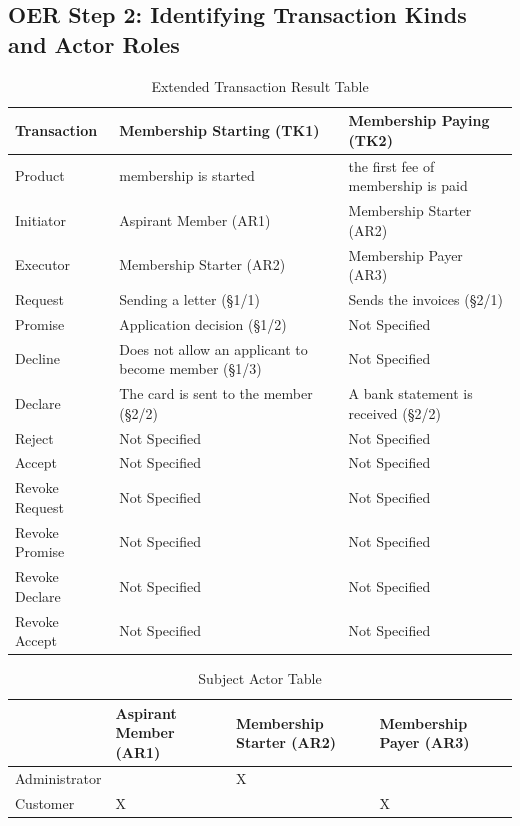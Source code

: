 \begin{landscape}
\section{OER Step 2: Identifying Transaction Kinds and Actor Roles}

\begin{table}[h]
\caption{Extended Transaction Result Table}
\label{tab:etrt}
\begin{tabular}{|l||l|l|}
\hline
Transaction  & Membership Starting (TK1) & Membership Paying (TK2) \\ \hline
Product      & membership is started  & the first fee of membership is paid \\ \hline
Initiator      & Aspirant Member (AR1)   &  Membership Starter (AR2)\\ \hline
Executor       & Membership Starter (AR2) & Membership Payer (AR3)       \\ \hline
Request        & Sending a letter (\S1/1)  & Sends the invoices (\S2/1)   \\ \hline
Promise        &  Application decision  (\S1/2)  &  Not Specified    \\ \hline
Decline        &  Does not allow an applicant to become member (\S1/3)  & Not Specified  \\ \hline
Declare        & The card is sent to the member (\S2/2) & A bank statement is received  (\S2/2) \\ \hline
Reject         &  Not Specified             &  Not Specified   \\ \hline
Accept         & Not Specified  &  Not Specified  \\ \hline
Revoke Request & Not Specified                   & Not Specified        \\ \hline
Revoke Promise & Not Specified                   &  Not Specified       \\ \hline
Revoke Declare & Not Specified                    &  Not Specified      \\ \hline
Revoke Accept  &  Not Specified             &   Not Specified             \\ \hline
\end{tabular}
\end{table}

\begin{table}[h]
\caption{Subject Actor Table}
\label{tab:subjectactortable}
\begin{tabular}{|l|l|l|l|}
\hline
  & Aspirant Member (AR1)       & Membership Starter (AR2)  & Membership Payer (AR3)  \\ \hline
Administrator   &  & X  &   \\ \hline
Customer & X &  & X \\ \hline
\end{tabular}
\end{table}

\end{landscape}

